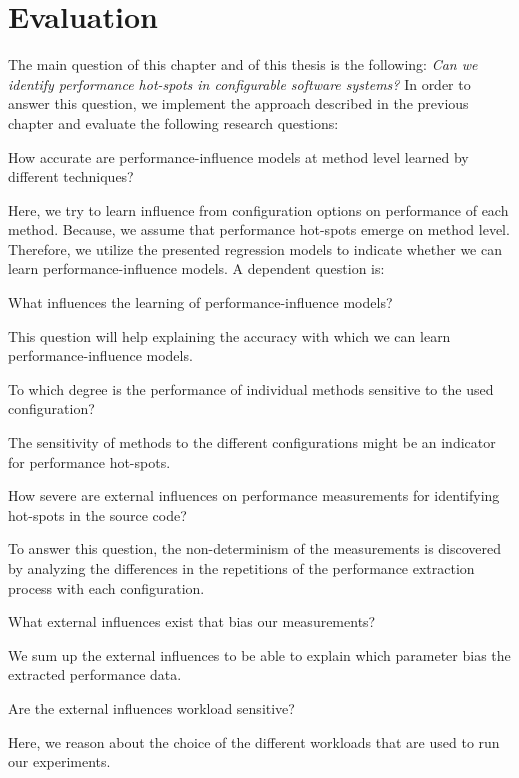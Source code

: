 \chapter{Evaluation}
\label{chap:analysis}

The main question of this chapter and of this thesis is the following: \emph{Can we identify performance hot-spots in configurable software systems?} In order to answer this question, we implement the approach described in the previous chapter and evaluate the following research questions:


\begin{researchq}

	\item How accurate are performance-influence models at method level learned by different techniques?
	\label{rq:perf_infl_model}
	
	Here, we try to learn influence from configuration options on performance of each method. Because, we assume that performance hot-spots emerge on method level. Therefore, we utilize the presented regression models to indicate whether we can learn performance-influence models. A dependent question is:
	\begin{researchq}
		\item What influences the learning of performance-influence models?
		\label{rq:learning influence}

		This question will help explaining the accuracy with which we can learn performance-influence models.
	\end{researchq}


	\item To which degree is the performance of individual methods sensitive to the used configuration?
	\label{rq:sensitivity}

	The sensitivity of methods to the different configurations might be an indicator for performance hot-spots. 


	\item How severe are external influences on performance measurements for identifying hot-spots in the source code?
	\label{rq:external_influence}

	To answer this question, the non-determinism of the measurements is discovered by analyzing the differences in the repetitions of the performance extraction process with each configuration.  
	\begin{researchq}
		\item What external influences exist that bias our measurements?
		\label{rq:what_influences}

		We sum up the external influences to be able to explain which parameter bias the extracted performance data.

		\item Are the external influences workload sensitive?
		\label{rq:ext_inf_sensitivity}

		Here, we reason about the choice of the different workloads that are used to run our experiments. 
	\end{researchq}

\end{researchq}



